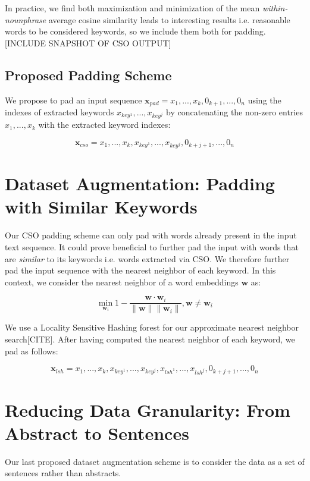 In practice, we find both maximization and minimization of the mean \textit{within-nounphrase}
average cosine similarity leads to interesting results i.e. reasonable words to be
considered keywords, so we include them both for padding.
[INCLUDE SNAPSHOT OF CSO OUTPUT]

\subsection{Proposed Padding Scheme}
We propose to pad an input sequence $\bm{x}_{pad} = x_1, ..., x_k, 0_{k+1}, ..., 0_n$ using
the indexes of extracted keywords $x_{key^1}, ..., x_{key^j}$ by concatenating
the non-zero entries $x_1, ..., x_k$ with the extracted keyword indexes:

\[\bm{x}_{cso} = x_1, ..., x_k, x_{key^1}, ..., x_{key^j}, 0_{k+j+1}, ..., 0_n\]


\section{Dataset Augmentation: Padding with Similar Keywords}
Our CSO padding scheme can only pad with words already present in the input
text sequence. It could prove beneficial to further pad the input with words that are \textit{similar}
to its keywords i.e. words extracted via CSO. We therefore further pad the input sequence
with the nearest neighbor of each keyword. In this context, we consider the nearest neighbor
of a word embeddings $\bm{w}$ as:

\[\min_{\bm{w}_i} 1 - \frac{\bm{w} \cdot \bm{w}_i}{\lVert \bm{w} \rVert \lVert \bm{w}_i \rVert}, \bm{w} \neq \bm{w}_i\]

We use a Locality Sensitive Hashing forest for our approximate nearest neighbor search[CITE].
After having computed the nearest neighbor of each keyword, we pad as follows:

\[\bm{x}_{lsh} = x_1, ..., x_k, x_{key^1}, ..., x_{key^j},x_{lsh^1}, ..., x_{lsh^j}, 0_{k+j+1}, ..., 0_n\]

\section{Reducing Data Granularity: From Abstract to Sentences}
Our last proposed dataset augmentation scheme is to consider the data as a set of sentences rather than abstracts.
